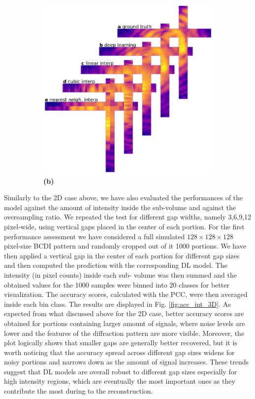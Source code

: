 \begin{figure}[ht]
\begin{subfigure}{0.47\textwidth}
        \includegraphics[width=\linewidth]{figures/Inpainting/cross_interp.pdf}
        \caption{\textbf{(b)}}
    \end{subfigure}
    \caption{}
    \label{fig:interp}
\end{figure}


Similarly to the 2D case above, we have also evaluated the performances of the model against the amount of intensity 
inside the sub-volume and against the oversampling ratio. We repeated the test for different gap widths, namely 3,6,9,12 
pixel-wide, using vertical gaps placed in the center of each portion. 
For the first performance assessment we have considered a full simulated $128\times128\times128$ pixel-size BCDI pattern
and randomly cropped out of it 1000 portions. We have then applied a vertical gap in the center of each portion for different 
gap sizes and then computed the prediction with the corresponding DL model. The intensity (in pixel counts) inside each sub-
volume was then summed and the obtained values for the 1000 samples were binned into 20 classes for better visualization. 
The accuracy scores, calculated with the PCC, were then averaged inside each bin class. The results are displayed in Fig. 
\ref{fig:acc_int_3D}. As expected from what discussed above for the 2D case, better accuracy scores are obtained for portions
containing larger amount of signals, where noise levels are lower and the features of the diffraction pattern are more 
visible. Moreover, the plot logically shows that smaller gaps are generally better recovered, but it is worth noticing
that the accuracy spread across different gap sizes widens for noisy portions and narrows down as the amount of signal 
increases. These trends suggest that DL models are overall robust to different gap sizes especially for high intensity regions, 
which are eventually the most important ones as they contribute the most during to the reconstruction. 


